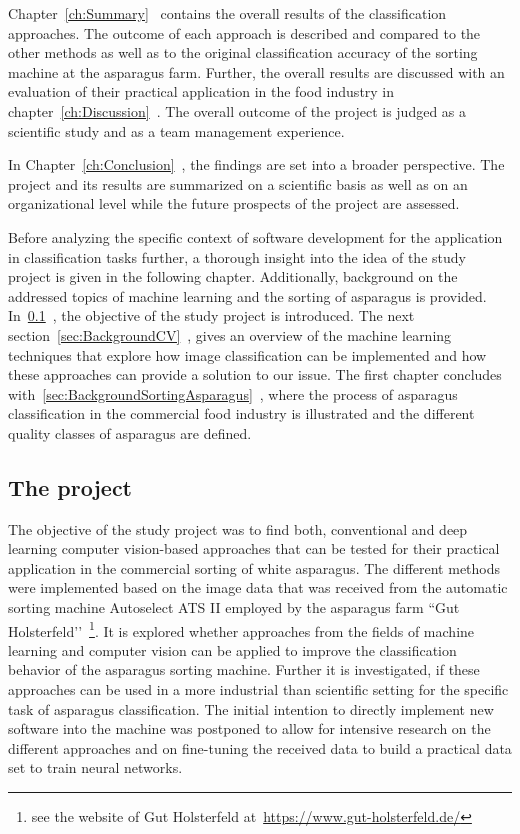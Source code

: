 Chapter~\ref{ch:Summary}~ contains the overall results of the classification approaches. The outcome of each approach is described and compared to the other methods as well as to the original classification accuracy of the sorting machine at the asparagus farm. Further, the overall results are discussed with an evaluation of their practical application in the food industry in chapter~\ref{ch:Discussion}~. The overall outcome of the project is judged as a scientific study and as a team management experience.

In Chapter~\ref{ch:Conclusion}~, the findings are set into a broader perspective. The project and its results are summarized on a scientific basis as well as on an organizational level while the future prospects of the project are assessed.

\bigskip
Before analyzing the specific context of software development for the application in classification tasks further, a thorough insight into the idea of the study project is given in the following chapter. Additionally, background on the addressed topics of machine learning and the sorting of asparagus is provided.
In~\ref{sec:Project}~, the objective of the study project is introduced. The next section~\ref{sec:BackgroundCV}~, gives an overview of the machine learning techniques that explore how image classification can be implemented and how these approaches can provide a solution to our issue. The first chapter concludes with~\ref{sec:BackgroundSortingAsparagus}~, where the process of asparagus classification in the commercial food industry is illustrated and the different quality classes of asparagus are defined.


\subsection{The project}
\label{sec:Project}

The objective of the study project was to find both, conventional and deep learning computer vision-based approaches that can be tested for their practical application in the commercial sorting of white asparagus. The different methods were implemented based on the image data that was received from the automatic sorting machine Autoselect ATS II employed by the asparagus farm ``Gut Holsterfeld’’~\footnote{see the website of Gut Holsterfeld at~\url{https://www.gut-holsterfeld.de/}}. It is explored whether approaches from the fields of machine learning and computer vision can be applied to improve the classification behavior of the asparagus sorting machine. Further it is investigated, if these approaches can be used in a more industrial than scientific setting for the specific task of asparagus classification. The initial intention to directly implement new software into the machine was postponed to allow for intensive research on the different approaches and on fine-tuning the received data to build a practical data set to train neural networks.

